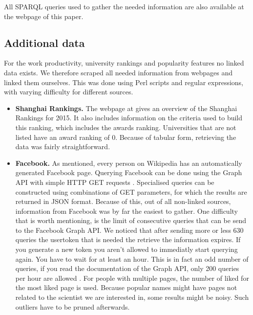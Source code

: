 \noindent All SPARQL queries used to gather the needed information are also available at the webpage of this paper.

\subsection{Additional data}
\label{ssec:additional}

For the work productivity, university rankings and popularity features no linked data exists. We therefore scraped all needed information from webpages and linked them ourselves. This was done using Perl scripts and regular expressions, with varying difficulty for different sources.

\begin{itemize}
\item{\textbf{Shanghai Rankings. }} 	
The webpage at \cite{rankings} gives an overview of the Shanghai Rankings for 2015. 
It also includes  information on the criteria used to build this ranking, which includes the awards ranking. Universities that are not listed have an award ranking of 0. Because of tabular form, retrieving the data was fairly straightforward.

\item{\textbf{Facebook. }} As mentioned, every person on Wikipedia has an automatically generated Facebook page. Querying Facebook can be done using the Graph API with simple HTTP GET requests \cite{graphAPI}. Specialised queries can be constructed using combinations of GET parameters, for which the results are returned in JSON format. Because of this, out of all non-linked sources, information from Facebook was by far the easiest to gather. One difficulty that is worth mentioning, is the limit of consecutive queries that can be send to the Facebook Graph API.
We noticed that after sending more or less 630 queries the usertoken that is needed the retrieve the information expires. If you generate a new token you aren't allowed to immediatly start querying again. You have to wait for at least an hour. 
This is in fact an odd number of queries, if you read the documentation of the Graph API, only 200 queries per hour are allowed \cite{graphAPIlimit}.
For people with multiple pages, the number of liked for the most liked page is used. Because popular names might have pages not related to the scientist we are interested in, some results might be noisy. Such outliers have to be pruned afterwards.


\end{itemize}
